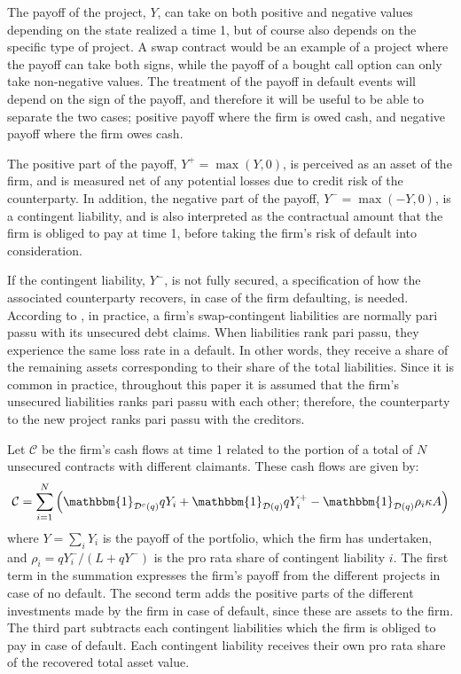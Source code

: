 \documentclass[../main.tex]{subfiles}
\begin{document}
        The payoff of the project, $Y$, can take on both positive and negative values
        depending on the state realized a time 1, 
        but of course also depends on the specific type of project. 
        A swap contract would be an example of a project where the payoff can take both signs,
        while the payoff of a bought call option can only take non-negative values.
        The treatment of the payoff in default events will depend on the sign of the payoff,
        and therefore it will be useful to be able to separate the two cases;
        positive payoff where the firm is owed cash,
        and negative payoff where the firm owes cash.

        The positive part of the payoff, $Y^{+}=\max\left(Y,0\right)$, is perceived as an asset of the firm, and is measured net of any potential losses due to credit risk of the counterparty.
        In addition, the negative part of the payoff, $Y^{-} = \max \left(-Y,0\right)$, is a contingent liability, and is also interpreted as the contractual amount that the firm is obliged to pay at time 1, before taking the firm's risk of default into consideration.

        If the contingent liability, $Y^{-}$, is not fully secured, a specification of how the associated counterparty recovers, in case of the firm defaulting, is needed.
        According to \textcite{ADS2019}, in practice, a firm's swap-contingent liabilities 
        are normally pari passu with its unsecured debt claims.
        When liabilities rank pari passu, they experience the same loss rate in a default.
        In other words, they receive a share of the remaining assets 
        corresponding to their share of the total liabilities.
        Since it is common in practice, throughout this paper it is assumed that the firm's 
        unsecured liabilities ranks pari passu with each other;
        therefore, the counterparty to the new project ranks pari passu with the creditors.

        Let $\mathcal{C}$ be the firm's cash flows at time 1 related to the portion of a total of $N$ unsecured contracts with different claimants. These cash flows are given by:
        \begin{equation}
            \mathcal{C} = 
            \sum_{i=1}^{N} \left(
                \mathbbm{1}_{\mathcal{D}^{c}(q)} qY_{i}
                + \mathbbm{1}_{\mathcal{D}(q)} qY_{i}^{+}
                - \mathbbm{1}_{\mathcal{D}(q)} \rho_{i} \kappa A
            \right)
        \end{equation}
        where $Y = \sum_{i} Y_{i}$ is the payoff of the portfolio, which the firm has undertaken, and $\rho_{i} = qY_{i}^{-}/(L + qY^{-})$ is the pro rata share of contingent liability $i$. The first term in the summation expresses the firm's payoff from the different projects in case of no default. The second term adds the positive parts of the different investments made by the firm in case of default, since these are assets to the firm. The third part subtracts each contingent liabilities which the firm is obliged to pay in case of default. Each contingent liability receives their own pro rata share of the recovered total asset value.
\end{document}
